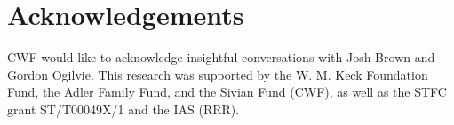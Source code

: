 \section*{Acknowledgements}

CWF would like to acknowledge insightful conversations with Josh Brown and Gordon Ogilvie. This research was supported by the W. M. Keck Foundation Fund, the Adler Family Fund, and the Sivian Fund (CWF), as well as the STFC grant ST/T00049X/1 and the IAS (RRR). 